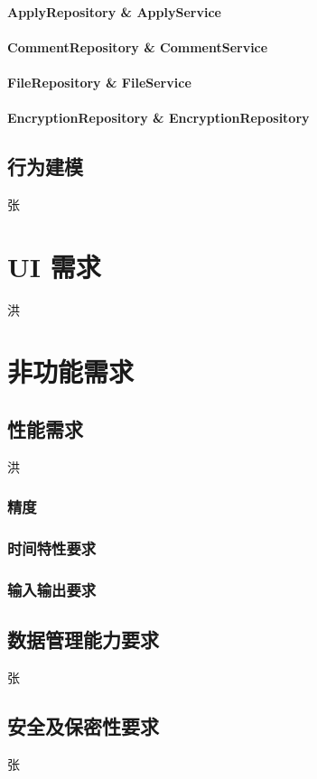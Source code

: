 \documentclass[UTF8]{ctexart}
\begin{document}
\paragraph{ApplyRepository \& ApplyService}
\paragraph{CommentRepository \& CommentService}
\paragraph{FileRepository \& FileService}
\paragraph{EncryptionRepository \& EncryptionRepository}

\subsection{行为建模}
张

\section{UI 需求}
洪

\section{非功能需求}
\subsection{性能需求}
洪
\subsubsection{精度}

\subsubsection{时间特性要求}

\subsubsection{输入输出要求}

\subsection{数据管理能力要求}
张
\subsection{安全及保密性要求}
张
\end{document}
